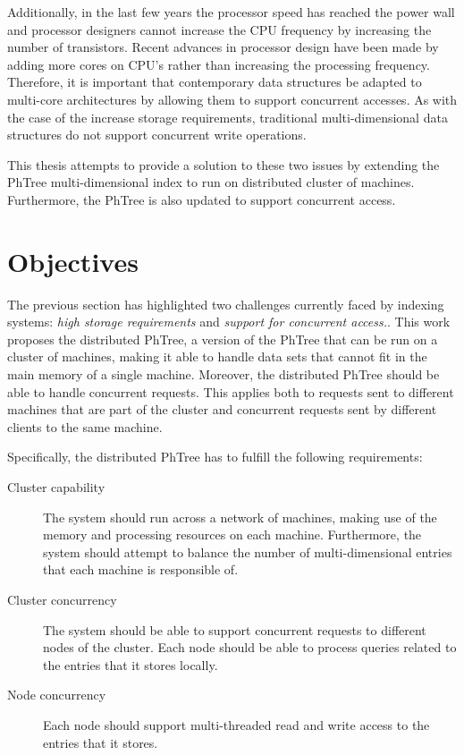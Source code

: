 \documentclass[11pt,a4paper]{globis-book}
\begin{document}
Additionally, in the last few years the processor speed has reached the power wall and processor designers cannot increase the CPU frequency by increasing the number of transistors. Recent advances in processor design have been made by adding more cores on CPU's rather than increasing the processing frequency. Therefore, it is important that contemporary data structures be adapted to multi-core architectures by allowing them to support concurrent accesses. As with the case of the increase storage requirements, traditional multi-dimensional data structures do not support concurrent write operations.

This thesis attempts to provide a solution to these two issues by extending the PhTree multi-dimensional index to run on distributed cluster of machines. Furthermore, the PhTree is also updated to support concurrent access.

\section{Objectives}
\label{sec:intro-objectives}
The previous section has highlighted two challenges currently faced by indexing systems: \textit{high storage requirements} and \textit{support for concurrent access.}. This work proposes the distributed PhTree, a version of the PhTree that can be run on a cluster of machines, making it able to handle data sets that cannot fit in the main memory of a single machine. Moreover, the distributed PhTree should be able to handle concurrent requests. This applies both to requests sent to different machines that are part of the cluster and concurrent requests sent by different clients to the same machine. 

Specifically, the distributed PhTree has to fulfill the following requirements:
\begin{description}
    \item[Cluster capability] The system should run across a network of machines, making use of the memory and processing resources on each machine. Furthermore, the system should attempt to balance the number of multi-dimensional entries that each machine is responsible of.
    \item[Cluster concurrency] The system should be able to support concurrent requests to different nodes of the cluster. Each node should be able to process queries related to the entries that it stores locally.
    \item[Node concurrency] Each node should support multi-threaded read and write access to the entries that it stores.
\end{description} 
\end{document}
